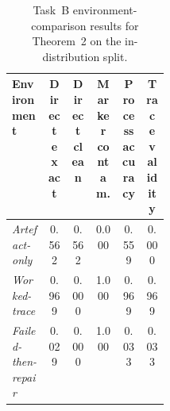 \begin{table}[t]
\centering
\footnotesize
\setlength{\tabcolsep}{3pt}
\caption{Task~B environment-comparison results for Theorem~2 on the in-distribution split.}
\label{tab:appx-theorem2-positive-protocol}
\begin{tabular}{p{0.23\linewidth}ccccc}
\toprule
Environment & \shortstack{Direct\\exact} & \shortstack{Direct\\clean} & \shortstack{Marker\\contam.} & \shortstack{Process\\accuracy} & \shortstack{Trace\\validity} \\
\midrule
\emph{Artefact-only} & 0.562 & 0.562 & 0.000 & 0.559 & 0.000 \\
\emph{Worked-trace} & 0.969 & 0.000 & 1.000 & 0.969 & 0.969 \\
\emph{Failed-then-repair} & 0.029 & 0.000 & 1.000 & 0.033 & 0.033 \\
\bottomrule
\end{tabular}
\end{table}
